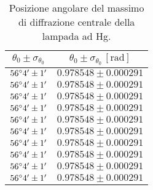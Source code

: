 \documentclass[]{article}
\begin{document}
    \begin{table}[H]
        \centering
        \begin{tabular}{||c|c||}
            \hline
            $\theta_0 \pm \sigma_{\theta_0}$ & $\theta_0 \pm \sigma_{\theta_0} \, \left[\text{rad}\right]$ \\\hline
            \hline
            $56\degree 4' \pm 1'$ & $0.978548 \pm 0.000291$ \\\hline
            $56\degree 4' \pm 1'$ & $0.978548 \pm 0.000291$ \\\hline
            $56\degree 4' \pm 1'$ & $0.978548 \pm 0.000291$ \\\hline
            $56\degree 4' \pm 1'$ & $0.978548 \pm 0.000291$ \\\hline
            $56\degree 4' \pm 1'$ & $0.978548 \pm 0.000291$ \\\hline
            $56\degree 4' \pm 1'$ & $0.978548 \pm 0.000291$ \\\hline
            $56\degree 4' \pm 1'$ & $0.978548 \pm 0.000291$ \\\hline
            $56\degree 4' \pm 1'$ & $0.978548 \pm 0.000291$ \\\hline
            $56\degree 4' \pm 1'$ & $0.978548 \pm 0.000291$ \\\hline
            $56\degree 4' \pm 1'$ & $0.978548 \pm 0.000291$ \\\hline
        \end{tabular}
        \caption{Posizione angolare del massimo di diffrazione centrale della lampada ad Hg.}
        \label{max-Hg}
    \end{table}
\end{document}
